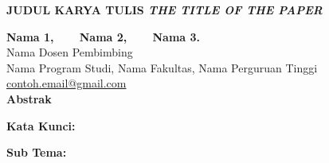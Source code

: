 \begin{center}
\textbf{\large JUDUL KARYA TULIS \textit{THE TITLE OF THE PAPER}}\\
\vspace{12pt}
    \textbf{Nama 1,\ \ \ \ Nama 2,\ \ \ \ Nama 3.}\\
    Nama Dosen Pembimbing\\
    Nama Program Studi, Nama Fakultas, Nama Perguruan Tinggi\\
    \href{mailto:contoh.email@gmail.com}{contoh.email@gmail.com}\vspace{6pt}\\
    \large \textbf{Abstrak}
\end{center}

     \lipsum[1]\vspace{12pt}
  
  \noindent\textbf{Kata Kunci:} \vspace{12pt}
  
  \noindent\textbf{Sub Tema:}